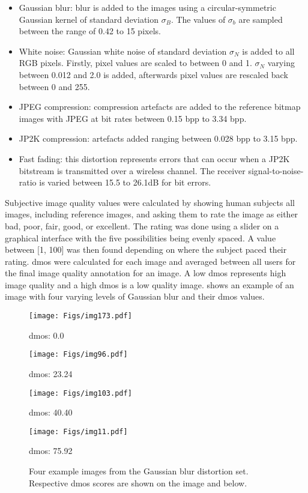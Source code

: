 \documentclass[a4paper,twoside]{article}
\begin{document}
\begin{itemize}
	\item Gaussian blur: blur is added to the images using a circular-symmetric Gaussian kernel of standard deviation $\sigma_B$. The values of $\sigma_b$ are sampled between the range of 0.42 to 15 pixels.
	\item White noise: Gaussian white noise of standard deviation $\sigma_N$ is added to all RGB pixels. Firstly, pixel values are scaled to between 0 and 1. $\sigma_N$ varying between 0.012 and 2.0 is added, afterwards pixel values are rescaled back between 0 and 255.
	\item JPEG compression: compression artefacts are added to the reference bitmap images with JPEG at bit rates between 0.15 \gls{bpp} to 3.34 \gls{bpp}.
	\item JP2K compression: artefacts added ranging between 0.028 \gls{bpp} to 3.15 \gls{bpp}.
	\item Fast fading: this distortion represents errors that can occur when a JP2K bitstream is transmitted over a wireless channel. The receiver signal-to-noise-ratio is varied between 15.5 to 26.1dB for bit errors.
\end{itemize}

Subjective image quality values were calculated by showing human subjects all images, including reference images, and asking them to rate the image as either bad, poor, fair, good, or excellent. The rating was done using a slider on a graphical interface with the five possibilities being evenly spaced. A value between [1, 100] was then found depending on where the subject paced their rating. \gls{dmos} were calculated for each image and averaged between all users for the final image quality annotation for an image. A low \gls{dmos} represents high image quality and a high \gls{dmos} is a low quality image.  shows an example of an image with four varying levels of Gaussian blur and their \gls{dmos} values.

\begin{figure*}[!h]
  \texttt{[image: Figs/img173.pdf]}
  \caption*{\gls{dmos}: 0.0}\label{fig:}
\endminipage\hfill
{}
  \texttt{[image: Figs/img96.pdf]}
  \caption*{\gls{dmos}: 23.24}\label{fig:}
\endminipage\hfill
{}
  \texttt{[image: Figs/img103.pdf]}
  \caption*{\gls{dmos}: 40.40}\label{fig:}
\endminipage\hfill
{}
  \texttt{[image: Figs/img11.pdf]}
  \caption*{\gls{dmos}: 75.92}\label{fig:}
\endminipage\hfill
\caption{Four example images from the Gaussian blur distortion set. Respective \gls{dmos} scores are shown on the image and below.}
\label{fig:iqdist}
\end{figure*}
\end{document}
